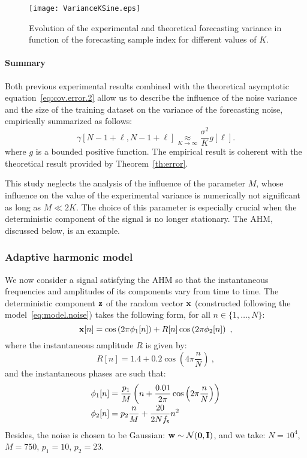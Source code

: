 \begin{figure}
\texttt{[image: VarianceKSine.eps]}
\caption{Evolution of the experimental and theoretical forecasting variance in function of the forecasting sample index for different values of $K$.}
\label{fig:res.size.sine}
\end{figure}

\paragraph{Summary}
Both previous experimental results combined with the theoretical asymptotic equation~\eqref{eq:cov.error.2} allow us to describe the influence of the noise variance and the size of the training dataset on the variance of the forecasting noise, empirically summarized as follows:
\begin{equation}
\gamma[N-1+\ell,N-1+\ell] \underset{K\to\infty}{\approx} \dfrac{\sigma^2}{K}g[\ell] .
\end{equation} 
where $g$ is a bounded positive function. The empirical result is coherent with the theoretical result provided by Theorem~\ref{th:error}.

This study neglects the analysis of the influence of the parameter $M$, whose influence on the value of the experimental variance is numerically not significant as long as $M\ll 2K$. The choice of this parameter is especially crucial when the deterministic component of the signal is no longer stationary. The AHM, discussed below, is an example.

\subsubsection{Adaptive harmonic model}
\label{ssse:res.ahm}
We now consider a signal satisfying the AHM so that the instantaneous frequencies and amplitudes of its components vary from time to time. The deterministic component ${\mathbf z}$ of the random vector ${\mathbf x}$ (constructed following the model~\eqref{eq:model.noise}) takes the following form, for all $n\in\{1,\ldots,N\}$:
\[
{\mathbf x}[n] = \cos\left(2\pi \phi_1[n] \right) + R[n]\cos\left(2\pi \phi_2[n] \right) \ ,
\] 
where the instantaneous amplitude $R$ is given by:
\[
R[n] = 1.4 + 0.2\cos\left(4\pi\frac{n}{N}\right)\ ,
\]
and the instantaneous phases are such that:
\begin{align*}
\phi_1[n] &= \frac{p_1}{M}\left( n + \frac{0.01}{2\pi}\cos\left(2\pi\frac{n}{N}\right) \right) \\[-1mm]
\phi_2[n] & = p_2\frac{n}{M} + \frac{20}{2Nf_{\mathsf s}}n^2
\end{align*}
Besides, the noise is chosen to be Gaussian: ${\mathbf w}\sim{\mathcal N}(\boldsymbol{0},{\mathbf I})$, and we take: $N=10^4$, $M=750$, $p_1=10$, $p_2=23$.

